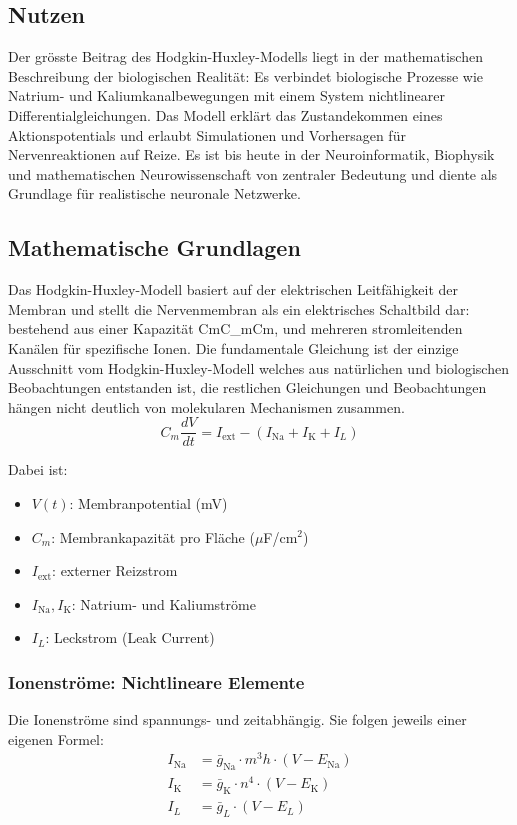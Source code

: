 \begin{refsection}
\subsection{Nutzen}
Der grösste Beitrag des Hodgkin-Huxley-Modells liegt in der mathematischen Beschreibung der biologischen Realität: Es verbindet biologische Prozesse wie Natrium- und Kaliumkanalbewegungen mit einem System nichtlinearer Differentialgleichungen. Das Modell erklärt das Zustandekommen eines Aktionspotentials und erlaubt Simulationen und Vorhersagen für Nervenreaktionen auf Reize. Es ist bis heute in der Neuroinformatik, Biophysik und mathematischen Neurowissenschaft von zentraler Bedeutung und diente als Grundlage für realistische neuronale Netzwerke.
\subsection{Mathematische Grundlagen}
Das Hodgkin-Huxley-Modell basiert auf der elektrischen Leitfähigkeit der Membran und stellt die Nervenmembran als ein elektrisches Schaltbild dar: bestehend aus einer Kapazität CmC_mCm, und mehreren stromleitenden Kanälen für spezifische Ionen.
Die fundamentale Gleichung ist der einzige Ausschnitt vom Hodgkin-Huxley-Modell welches aus natürlichen und biologischen Beobachtungen entstanden ist, die restlichen Gleichungen und Beobachtungen hängen nicht deutlich von molekularen Mechanismen zusammen.
\[
C_m \frac{dV}{dt} = I_{\text{ext}} - (I_{\text{Na}} + I_{\text{K}} + I_L)
\]

Dabei ist:

\begin{itemize}
	\item $V(t)$: Membranpotential (mV)
	\item $C_m$: Membrankapazität pro Fläche ($\mu$F/cm$^2$)
	\item $I_{\text{ext}}$: externer Reizstrom
	\item $I_{\text{Na}}, I_{\text{K}}$: Natrium- und Kaliumströme
	\item $I_L$: Leckstrom (Leak Current)
\end{itemize}
\subsubsection{Ionenströme: Nichtlineare Elemente}
Die Ionenströme sind spannungs- und zeitabhängig. Sie folgen jeweils einer eigenen Formel:
\[
\begin{aligned}
	I_{\text{Na}} &= \bar{g}_{\text{Na}} \cdot m^3 h \cdot (V - E_{\text{Na}}) \\
	I_{\text{K}} &= \bar{g}_{\text{K}} \cdot n^4 \cdot (V - E_{\text{K}}) \\
	I_L &= \bar{g}_L \cdot (V - E_L)
\end{aligned}
\]


\end{refsection}
